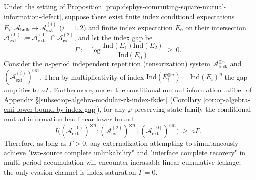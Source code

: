 \begin{corollary}\label{cor:dephys-multiplicity-index-gap-linear-cmi}
Under the setting of Proposition \ref{prop:dephys-commuting-square-mutual-information-defect},
suppose there exist finite index conditional expectations \(E_i:\mathcal{A}_{\mathrm{bulk}}\to \mathcal{A}_{\mathrm{ext}}^{(i)}\) (\(i=1,2\)) and finite index expectation \(E_0\) on their intersection \(\mathcal{A}_{\mathrm{ext}}^{(0)}:=\mathcal{A}_{\mathrm{ext}}^{(1)}\cap\mathcal{A}_{\mathrm{ext}}^{(2)}\), and let the index gap be
\[
\Gamma:=\log\frac{\mathrm{Ind}(E_1)\mathrm{Ind}(E_2)}{\mathrm{Ind}(E_0)}\ \ge\ 0.
\]
Consider the \(n\)-period independent repetition (tensorization) system \(\mathcal{A}_{\mathrm{bulk}}^{\otimes n}\) and \((\mathcal{A}_{\mathrm{ext}}^{(i)})^{\otimes n}\).
Then by multiplicativity of index
\(
\mathrm{Ind}(E_i^{\otimes n})=\mathrm{Ind}(E_i)^n
\)
the gap amplifies to \(n\Gamma\).
Furthermore, under the conditional mutual information caliber of Appendix \S\ref{subsec:op-algebra-modular-zk-index-fkdet} (Corollary \ref{cor:op-algebra-cmi-lower-bound-by-index-gap}), for any \(\varphi\)-preserving state family the conditional mutual information has linear lower bound
\[
\boxed{\;
I\bigl((\mathcal{A}_{\mathrm{ext}}^{(1)})^{\otimes n}:(\mathcal{A}_{\mathrm{ext}}^{(2)})^{\otimes n}\,\big|\,(\mathcal{A}_{\mathrm{ext}}^{(0)})^{\otimes n}\bigr)
\ \ge\ n\Gamma.\;}
\]
Therefore, as long as \(\Gamma>0\), any externalization attempting to simultaneously achieve "two-source complete unlinkability" and "interface complete recovery" in multi-period accumulation will encounter inerasable linear cumulative leakage; the only evasion channel is index saturation \(\Gamma=0\).
\end{corollary}

